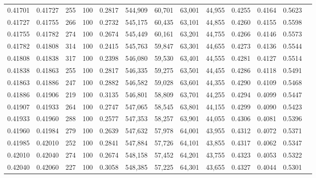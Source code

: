 \begin{tabular}{rrrrrrrrrrrrr}
0.41701 & 0.41727 &    255 & 100 &                                     0.2817 & 544,909 &  60,701 &  63,001 &  44,955 & 0.4255 & 0.4164 & 0.5623 \\
0.41727 & 0.41755 &    266 & 100 &                                     0.2732 & 545,175 &  60,435 &  63,101 &  44,855 & 0.4260 & 0.4155 & 0.5598 \\
0.41755 & 0.41782 &    274 & 100 &                                     0.2674 & 545,449 &  60,161 &  63,201 &  44,755 & 0.4266 & 0.4146 & 0.5573 \\
0.41782 & 0.41808 &    314 & 100 &                                     0.2415 & 545,763 &  59,847 &  63,301 &  44,655 & 0.4273 & 0.4136 & 0.5544 \\
0.41808 & 0.41838 &    317 & 100 &                                     0.2398 & 546,080 &  59,530 &  63,401 &  44,555 & 0.4281 & 0.4127 & 0.5514 \\
0.41838 & 0.41863 &    255 & 100 &                                     0.2817 & 546,335 &  59,275 &  63,501 &  44,455 & 0.4286 & 0.4118 & 0.5491 \\
0.41863 & 0.41886 &    247 & 100 &                                     0.2882 & 546,582 &  59,028 &  63,601 &  44,355 & 0.4290 & 0.4109 & 0.5468 \\
0.41886 & 0.41906 &    219 & 100 &                                     0.3135 & 546,801 &  58,809 &  63,701 &  44,255 & 0.4294 & 0.4099 & 0.5447 \\
0.41907 & 0.41933 &    264 & 100 &                                     0.2747 & 547,065 &  58,545 &  63,801 &  44,155 & 0.4299 & 0.4090 & 0.5423 \\
0.41933 & 0.41960 &    288 & 100 &                                     0.2577 & 547,353 &  58,257 &  63,901 &  44,055 & 0.4306 & 0.4081 & 0.5396 \\
0.41960 & 0.41984 &    279 & 100 &                                     0.2639 & 547,632 &  57,978 &  64,001 &  43,955 & 0.4312 & 0.4072 & 0.5371 \\
0.41985 & 0.42010 &    252 & 100 &                                     0.2841 & 547,884 &  57,726 &  64,101 &  43,855 & 0.4317 & 0.4062 & 0.5347 \\
0.42010 & 0.42040 &    274 & 100 &                                     0.2674 & 548,158 &  57,452 &  64,201 &  43,755 & 0.4323 & 0.4053 & 0.5322 \\
0.42040 & 0.42060 &    227 & 100 &                                     0.3058 & 548,385 &  57,225 &  64,301 &  43,655 & 0.4327 & 0.4044 & 0.5301 \\

\end{tabular}

